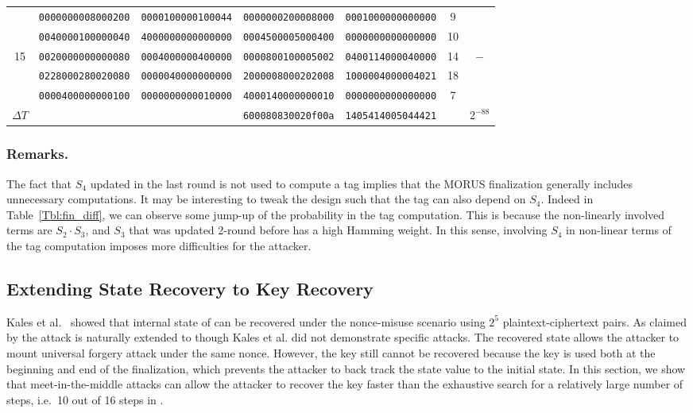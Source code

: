 \begin{table}[!tb]
\begin{center}
{\begin{tabular}{ccccccc}
      & {\tt 0000000008000200} & {\tt 0000100000100044} & {\tt 0000000200008000} & {\tt 0001000000000000} & 9  & \\
      & {\tt 0040000100000040} & {\tt 4000000000000000} & {\tt 0004500005000400} & {\tt 0000000000000000} & 10 & \\
15    & {\tt 0020000000000080} & {\tt 0004000000400000} & {\tt 0000800100005002} & {\tt 0400114000040000} & 14 & $-$\\
      & {\tt 0228000280020080} & {\tt 0000040000000000} & {\tt 2000008000202008} & {\tt 1000004000004021} & 18 & \\
      & {\tt 0000400000000100} & {\tt 0000000000010000} & {\tt 4000140000000010} & {\tt 0000000000000000} & 7  & \\ \hline

$\Delta T$ &                   &                        & {\tt 600080830020f00a} & {\tt 1405414005044421} & & $2^{-88}$ \\ \hline
\end{tabular}
}
\end{center}
\end{table}

\subsubsection{Remarks.} The fact that $S_4$ updated in the last round is not used to compute a tag implies that the MORUS finalization generally includes unnecessary computations. It may be interesting to tweak the design such that the tag can also depend on $S_4$. Indeed in Table~\ref{Tbl:fin_diff}, we can observe some jump-up of the probability in the tag computation. This is because the non-linearly involved terms are $S_2 \cdot S_3$, and $S_3$ that was updated 2-round before has a high Hamming weight. In this sense, involving $S_4$ in non-linear terms of the tag computation imposes more difficulties for the attacker.




\subsection{Extending State Recovery to Key Recovery}
\label{subsec/Ini}
Kales et al.~\cite{cryptoeprint:2017:1137} showed that internal state of  can be recovered under the nonce-misuse scenario using $2^5$ plaintext-ciphertext pairs. As claimed by \cite{cryptoeprint:2017:1137} the attack is naturally extended to  though Kales et al. \cite{cryptoeprint:2017:1137} did not demonstrate specific attacks. The recovered state allows the attacker to mount universal forgery attack under the same nonce. However, the key still cannot be recovered because the key is used both at the beginning and end of the finalization, which prevents the attacker to back track the state value to the initial state. In this section, we show that meet-in-the-middle attacks can allow the attacker to recover the key faster than the exhaustive search for a relatively large number of steps, i.e.~10 out of 16 steps in . 

